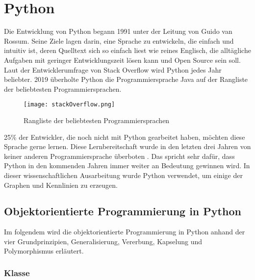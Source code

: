 
\chapter{Python}

Die Entwicklung von Python begann 1991 unter der Leitung von Guido van Rossum. Seine Ziele lagen darin, eine Sprache zu entwickeln, die einfach und intuitiv ist, deren Quelltext sich so einfach liest wie reines Englisch, die alltägliche Aufgaben mit geringer Entwicklungszeit lösen kann und Open Source sein soll.
Laut der Entwicklerumfrage von Stack Overflow wird Python jedes Jahr beliebter. 2019 überholte Python die Programmiersprache Java auf der Rangliste der beliebtesten Programmiersprachen. 

\begin{figure}[!htb]
\texttt{[image: stackOverflow.png]}%
\caption{Rangliste der beliebtesten Programmiersprachen }
\label{img:stackoverflowBild}
\end{figure}

25\% der Entwickler, die noch nicht mit Python gearbeitet haben, möchten diese Sprache gerne lernen. Diese Lernbereitschaft wurde in den letzten drei Jahren von keiner anderen Programmiersprache überboten \cite{stackoverflow}. Das spricht sehr dafür, dass Python in den kommenden Jahren immer weiter an Bedeutung gewinnen wird. In dieser wissenschaftlichen Ausarbeitung wurde Python verwendet, um einige der Graphen und Kennlinien zu erzeugen. 

\section{Objektorientierte Programmierung in Python}

Im folgendem wird die objektorientierte Programmierung in Python anhand der vier Grundprinzipien, Generalisierung, Vererbung, Kapselung und Polymorphismus erläutert. 

\subsection{Klasse}

